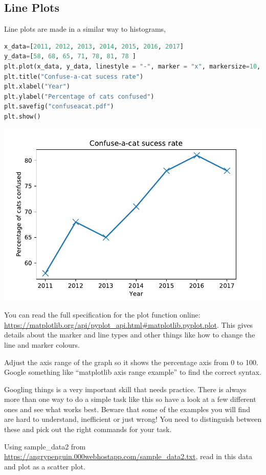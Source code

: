 	\subsection{Line Plots}
		Line plots are made in a similar way to histograms,
		\begin{lstlisting}[language=Python]
x_data=[2011, 2012, 2013, 2014, 2015, 2016, 2017]
y_data=[58, 68, 65, 71, 78, 81, 78 ]
plt.plot(x_data, y_data, linestyle = "-", marker = "x", markersize=10, linewidth=2)
plt.title("Confuse-a-cat sucess rate")
plt.xlabel("Year")
plt.ylabel("Percentage of cats confused")
plt.savefig("confuseacat.pdf")
plt.show()\end{lstlisting}
		\includegraphics[scale=0.8]{images/confuseacat}

You can read the full specification for the plot function online: \url{https://matplotlib.org/api/pyplot_api.html#matplotlib.pyplot.plot}. This gives details about the marker and line types and other things like how to change the line and marker colours.
\begin{task}Adjust the axis range of the graph so it shows the percentage axis from 0 to 100. Google something like ``matplotlib axis range example'' to find the correct syntax.\end{task}
Googling things is a very important skill that needs practice. There is always more than one way to do a simple task like this so have a look at a few different ones and see what works best. Beware that some of the examples you will find are hard to understand, inefficient or just wrong! You need to distinguish between these and pick out the right commands for your task.
\begin{task}Using sample\_data2 from \url{https://angrypenguin.000webhostapp.com/sample_data2.txt}, read in this data and plot as a scatter plot.\end{task}

